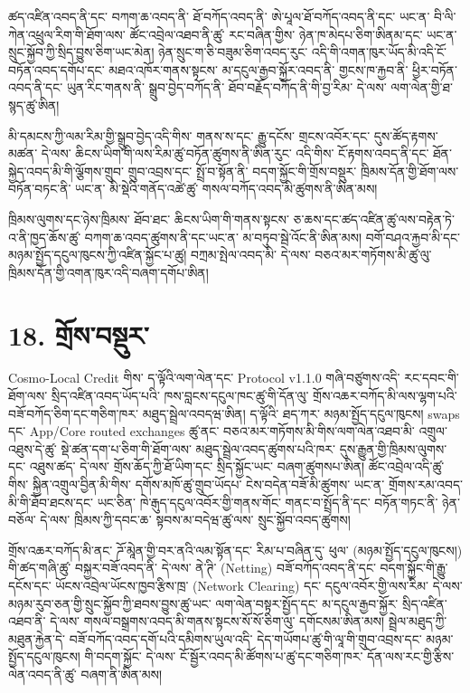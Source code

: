 \documentclass[11pt]{article}
\begin{document}
ཚད་འཛིན་འབད་ནི་དང་ བཀག་ཆ་འབད་ནི་ ཐོ་བཀོད་འབད་ནི་ ཨེ་པཱལ་ཐོ་བཀོད་འབད་ནི་དང་ ཡང་ན་ བི་ལི་ཀེན་འཕྲུལ་རིག་གི་ཐོག་ལས་ ཚོང་འབྲེལ་འཐབ་ནི་ཚུ་ རང་བཞིན་གྱིས་ ཉེན་ཁ་མེདཔ་ཅིག་ཨིནམ་དང་ ཡང་ན་ སྲུང་སྐྱོབ་ཀྱི་སྲིད་བྱུས་ཅིག་ཡང་མེན། ཉེན་སྲུང་ག་ཅི་བཟུམ་ཅིག་འབད་རུང་ འདི་གི་འགན་ཁུར་ཡོད་མི་འདི་ངོ་བཏོན་འབད་དགོཔ་དང་ མཐའ་འཁོར་གནས་སྟངས་ མ་དངུལ་རྒྱབ་སྐྱོར་འབད་ནི་ གྱངས་ཁ་རྐྱབ་ནི་ ཕྱིར་བཏོན་འབད་ནི་དང་ ཡུན་རིང་གནས་ནི་ སྒྲུབ་བྱེད་བཀོད་ནི་ ཐོབ་བརྗོད་བཀོད་ནི་གི་བྱ་རིམ་ དེ་ལས་ ལག་ལེན་གྱི་ཐ་སྙད་ཚུ་ཨིན།

མི་དམངས་ཀྱི་ལམ་རིམ་གྱི་སྒྲུབ་བྱེད་འདི་གིས་ གནས་ས་དང་ རྒྱུ་དངོས་ གྲངས་འབོར་དང་ དུས་ཚོད་རྟགས་མཚན་ དེ་ལས་ ཆིངས་ཡིག་གི་ལས་རིམ་ཚུ་བཏོན་ཚུགས་ནི་ཨིན་རུང་ འདི་གིས་ ངོ་རྟགས་འབད་ནི་དང་ ཐོན་སྐྱེད་འབད་མི་གི་ལྕོགས་གྲུབ་ གྲུབ་འབྲས་དང་ སྤྲོ་བ་སྟོན་ནི་ བདག་སྐྱོང་གི་གྲོས་བསྡུར་ ཁྲིམས་དོན་གྱི་ཐོག་ལས་བཏོན་བཏང་ནི་ ཡང་ན་ མི་སྡེའི་གནོད་འཚེ་ཚུ་ གསལ་བཀོད་འབད་མི་ཚུགས་ནི་ཨིན་མས།

ཁྲིམས་ལུགས་དང་ཉེས་ཁྲིམས་ ཐོབ་ཐང་ ཆིངས་ཡིག་གི་གནས་སྟངས་ ཅ་ཆས་དང་ཚད་འཛིན་ཚུ་ལས་བརྟེན་ཏེ་ འ་ནི་ཁྱད་ཆོས་ཚུ་ བཀག་ཆ་འབད་ཚུགས་ནི་དང་ཡང་ན་ མ་བཏུབ་སྦེ་འོང་ནི་ཨིན་མས། བགོ་བཤའ་རྐྱབ་མི་དང་མཉམ་སྤྱོད་དངུལ་ཁུངས་ཀྱི་འཛིན་སྐྱོང་པ་ཚུ། བཀྲམ་སྤེལ་འབད་མི་ དེ་ལས་ བཅའ་མར་གཏོགས་མི་ཚུ་ལུ་ ཁྲིམས་དོན་གྱི་འགན་ཁུར་འདི་བཞག་དགོཔ་ཨིན།


\section*{18. གྲོས་བསྡུར་}

Cosmo-Local Credit གིས་ ད་ལྟོའི་ལག་ལེན་དང་ Protocol v1.1.0 གཞི་བཙུགས་འདི་ རང་དབང་གི་ཐོག་ལས་ སྲིད་འཛིན་འབད་ཡོད་པའི་ ཁས་བླངས་དངུལ་ཁང་ཚུ་གི་དོན་ལུ་ གྲོས་འཆར་བཀོད་མི་ལས་ལྷག་པའི་ བཟོ་བཀོད་ཅིག་དང་གཅིག་ཁར་ མཐུད་སྦྲེལ་འབདཝ་ཨིན། ད་ལྟོའི་ ཐད་ཀར་ མཉམ་སྤྱོད་དངུལ་ཁུངས། swaps དང་ App/Core routed exchanges ཚུ་ནང་ བཅའ་མར་གཏོགས་མི་གིས་ལག་ལེན་འཐབ་མི་ འགྲུལ་འཐུས་དེ་ཚུ་ སྡེ་ཚན་དག་པ་ཅིག་གི་ཐོག་ལས་ མཐུད་སྦྲེལ་འབད་ཚུགས་པའི་ཁར་ དུས་རྒྱུན་གྱི་ཁྲིམས་ལུགས་དང་ འཐུས་ཚད་ དེ་ལས་ གྲོས་ཆོད་ཀྱི་ཐོ་ཡིག་དང་ སྲིད་སྐྱོང་ཡང་ བཞག་ཚུགསཔ་ཨིན། ཚོང་འབྲེལ་འདི་ཚུ་གིས་ སྐྱིན་འགྲུལ་བྱིན་མི་གིས་ དགོས་མཁོ་ཚུ་གྲུབ་ཡོདཔ་ ངེས་བདེན་བཟོ་མི་ཚུགས་ ཡང་ན་ གྲོགས་རམ་འབད་མི་གི་ཐོབ་ཐངས་དང་ ཡང་ཅིན་ ཁེ་རྒུད་དངུལ་འབོར་གྱི་གནས་གོང་ གནང་བ་སྤྲོད་ནི་དང་ བཏོན་གཏང་ནི་ ཉེན་བཅོལ་ དེ་ལས་ ཁྲིམས་ཀྱི་དབང་ཆ་ སྟབས་མ་བདེཝ་ཚུ་ལས་ སྲུང་སྐྱོབ་འབད་ཚུགས།

གྲོས་འཆར་བཀོད་མི་ནང་ ཌོ་མཱེན་གྱི་བར་ནའི་ལམ་སྟོན་དང་ རིམ་པ་བཞིན་དུ་ ཕུལ་ (མཉམ་སྤྱོད་དངུལ་ཁུངས།) གི་ཚད་གཞི་ཚུ་ བསྐྱར་བཟོ་འབད་ནི་ དེ་ལས་ ནེ་ཊི་ (Netting) བཟོ་བཀོད་འབད་ནི་དང་ བདག་སྐྱོང་གི་རྒྱུ་དངོས་དང་ ཡོངས་འབྲེལ་ཡོངས་ཁྱབ་རྩིས་ཁྲ་ (Network Clearing) དང་ དངུལ་འབོར་གྱི་ལས་རིམ་ དེ་ལས་ མཉམ་རུབ་ཅན་གྱི་སྲུང་སྐྱོབ་ཀྱི་ཐབས་བྱུས་ཚུ་ཡང་ ལག་ལེན་བསྟར་སྤྱོད་དང་ མ་དངུལ་རྒྱབ་སྐྱོར་ སྲིད་འཛིན་འཐབ་ནི་ དེ་ལས་ གསལ་བསྒྲགས་འབད་མི་གནས་སྟངས་སོ་སོ་ཅིག་ལུ་ དགོངསམ་ཨིན་མས། སྦྲེལ་མཐུད་ཀྱི་མཐུན་རྐྱེན་དེ་ བཟོ་བཀོད་འབད་དགོ་པའི་དམིགས་ཡུལ་འདི་ དེད་གཡོགཔ་ཚུ་གི་ལཱ་གི་གྲུབ་འབྲས་དང་ མཉམ་སྤྱོད་དངུལ་ཁུངས། གི་བདག་སྐྱོང་ དེ་ལས་ ངོ་སྦྱོར་འབད་མི་ཚོགས་པ་ཚུ་དང་གཅིག་ཁར་ དོན་ལས་རང་གྱི་རྩིས་ལེན་འབད་ནི་ཚུ་ བཞག་ནི་ཨིན་མས།
\end{document}
